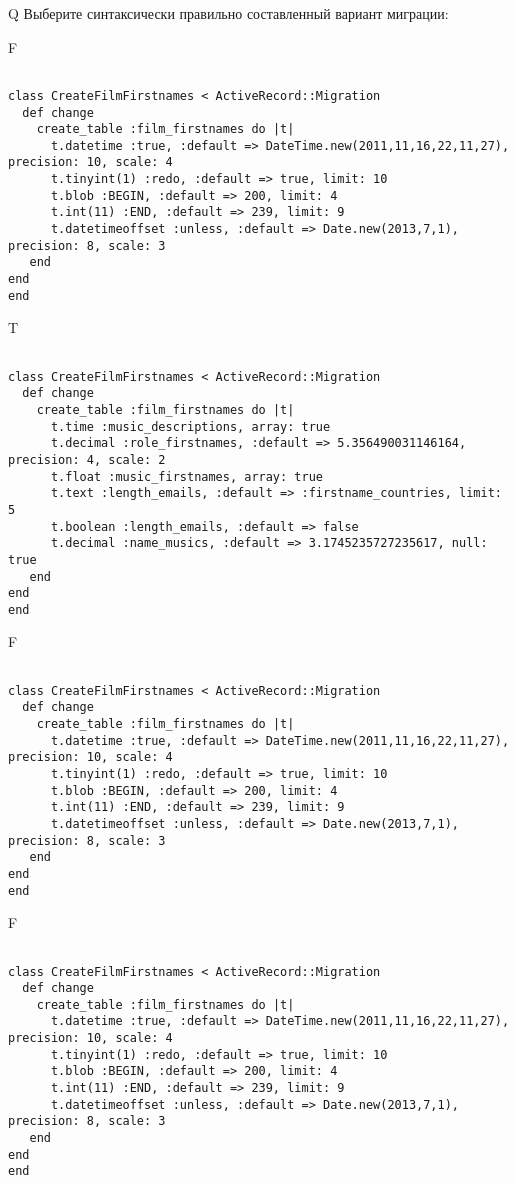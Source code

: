 Q
Выберите синтаксически правильно составленный вариант миграции:

F
\begin{verbatim}
		
class CreateFilmFirstnames < ActiveRecord::Migration 
  def change 
    create_table :film_firstnames do |t| 
      t.datetime :true, :default => DateTime.new(2011,11,16,22,11,27), precision: 10, scale: 4
      t.tinyint(1) :redo, :default => true, limit: 10
      t.blob :BEGIN, :default => 200, limit: 4
      t.int(11) :END, :default => 239, limit: 9
      t.datetimeoffset :unless, :default => Date.new(2013,7,1), precision: 8, scale: 3
   end
end
end
\end{verbatim}

T
\begin{verbatim}
		
class CreateFilmFirstnames < ActiveRecord::Migration 
  def change 
    create_table :film_firstnames do |t| 
      t.time :music_descriptions, array: true
      t.decimal :role_firstnames, :default => 5.356490031146164, precision: 4, scale: 2
      t.float :music_firstnames, array: true
      t.text :length_emails, :default => :firstname_countries, limit: 5
      t.boolean :length_emails, :default => false
      t.decimal :name_musics, :default => 3.1745235727235617, null: true
   end
end
end
\end{verbatim}

F
\begin{verbatim}
		
class CreateFilmFirstnames < ActiveRecord::Migration 
  def change 
    create_table :film_firstnames do |t| 
      t.datetime :true, :default => DateTime.new(2011,11,16,22,11,27), precision: 10, scale: 4
      t.tinyint(1) :redo, :default => true, limit: 10
      t.blob :BEGIN, :default => 200, limit: 4
      t.int(11) :END, :default => 239, limit: 9
      t.datetimeoffset :unless, :default => Date.new(2013,7,1), precision: 8, scale: 3
   end
end
end
\end{verbatim}

F
\begin{verbatim}
		
class CreateFilmFirstnames < ActiveRecord::Migration 
  def change 
    create_table :film_firstnames do |t| 
      t.datetime :true, :default => DateTime.new(2011,11,16,22,11,27), precision: 10, scale: 4
      t.tinyint(1) :redo, :default => true, limit: 10
      t.blob :BEGIN, :default => 200, limit: 4
      t.int(11) :END, :default => 239, limit: 9
      t.datetimeoffset :unless, :default => Date.new(2013,7,1), precision: 8, scale: 3
   end
end
end
\end{verbatim}

